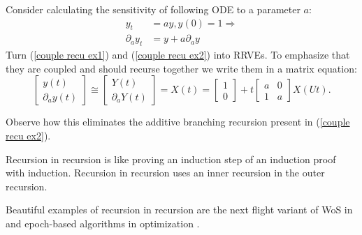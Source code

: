 \documentclass[a4paper,12pt]{article}
\begin{document}
\begin{example} \label{ex:coupled recursion}
  Consider calculating the
  sensitivity of following ODE to a
  parameter $a$:
  \begin{align}
    y_t             & =ay,y(0)=1 \Rightarrow \label{couple recu ex1} \\
    \partial_{a}y_t & = y + a \partial_{a}y \label{couple recu ex2}
  \end{align}
  Turn (\ref{couple recu ex1}) and (\ref{couple recu ex2}) into RRVEs.
  To emphasize that they are coupled and should
  recurse together we write them in a matrix equation:
  \begin{equation} \label{coupled mat}
    \begin{bmatrix}
      y(t) \\
      \partial_{a}y(t)
    \end{bmatrix} \cong
    \begin{bmatrix}
      Y(t) \\
      \partial_{a}Y(t)
    \end{bmatrix}=
    X(t)=
    \begin{bmatrix}
      1 \\
      0
    \end{bmatrix}+
    t \begin{bmatrix}
      a & 0 \\
      1 & a
    \end{bmatrix}
    X(Ut).
  \end{equation}

  Observe how this eliminates the additive branching recursion
  present in (\ref{couple recu ex2}).

\end{example}



\begin{technique}\label{tech:recu in recu}
  Recursion in recursion is like proving an induction
  step of an induction proof with induction. Recursion in recursion
  uses an inner recursion in the outer recursion.
\end{technique}

\begin{related}
  Beautiful examples of recursion in recursion are
  the next flight variant of WoS in
  \cite{sawhney_grid-free_2022} and epoch-based algorithms in optimization
  \cite{gupta_convergence_2021}.
\end{related}
\end{document}
